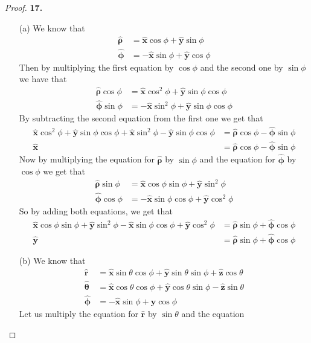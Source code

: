 \documentclass[11pt]{article}
\newcommand{\hatx}{\bm{\hat{x}}}
\newcommand{\haty}{\bm{\hat{y}}}
\newcommand{\hatz}{\bm{\hat{z}}}
\newcommand{\hatrho}{\bm{\hat{\rho}}}
\newcommand{\hatphi}{\bm{\hat{\phi}}}
\newcommand{\hatr}{\bm{\hat{r}}}
\newcommand{\hattheta}{\bm{\hat{\theta}}}
\theoremstyle{definition}
\begin{document}
\cleardoublepage
\begin{proof}{\textbf{17.}}
\begin{itemize}
    \item [(a)] We know that
    \begin{align*}
        \hatrho &= \hatx\cos\phi + \haty\sin\phi\\
        \hatphi &= -\hatx\sin\phi + \haty\cos\phi
    \end{align*}
    Then by multiplying the first equation by $\cos\phi$ and the second one by
    $\sin\phi$ we have that
    \begin{align*}
        \hatrho\cos\phi &= \hatx\cos^2\phi + \haty\sin\phi\cos\phi\\
        \hatphi\sin\phi &= -\hatx\sin^2\phi + \haty\sin\phi\cos\phi
    \end{align*}
    By subtracting the second equation from the first one we get that
    \begin{align*}
        \hatx\cos^2\phi + \haty\sin\phi\cos\phi
        +\hatx\sin^2\phi - \haty\sin\phi\cos\phi
        &= \hatrho\cos\phi - \hatphi\sin\phi\\
        \hatx &= \hatrho\cos\phi - \hatphi\sin\phi
    \end{align*}
    Now by multiplying the equation for $\hatrho$ by $\sin\phi$ and
    the equation for $\hatphi$ by $\cos\phi$ we get that
    \begin{align*}
        \hatrho\sin\phi &= \hatx\cos\phi\sin\phi + \haty\sin^2\phi\\
        \hatphi\cos\phi &= -\hatx\sin\phi\cos\phi + \haty\cos^2\phi
    \end{align*}
    So by adding both equations, we get that
    \begin{align*}
        \hatx\cos\phi\sin\phi + \haty\sin^2\phi
        -\hatx\sin\phi\cos\phi + \haty\cos^2\phi
        &= \hatrho\sin\phi + \hatphi\cos\phi\\
        \haty &= \hatrho\sin\phi + \hatphi\cos\phi
    \end{align*}
    \item [(b)] We know that 
    \begin{align*}
        \hatr &= \hatx\sin\theta\cos\phi + \haty\sin\theta\sin\phi + \hatz\cos\theta\\
        \hattheta &= \hatx\cos\theta\cos\phi + \haty\cos\theta\sin\phi - \hatz\sin\theta\\
        \hatphi &= -\hatx \sin\phi + \haty\cos\phi
    \end{align*}
    Let us multiply the equation for $\hatr$ by $\sin\theta$ and the equation

\end{itemize}
\end{proof}
\end{document}
